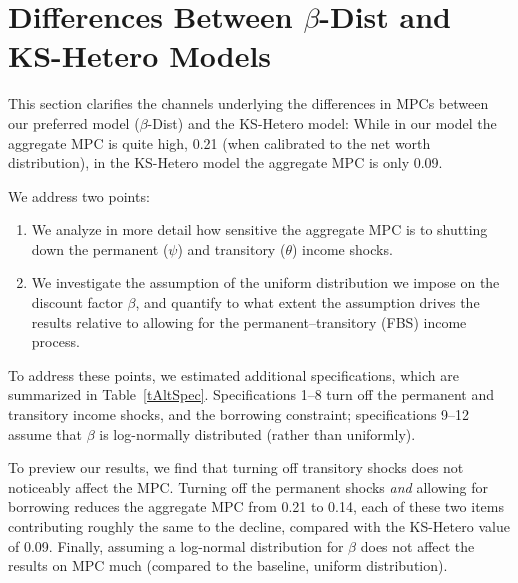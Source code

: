 \documentclass{econtex}\usepackage[pdftex]{graphicx}\usepackage{epstopdf} \usepackage[pdftex]{hyperref}
\begin{document}
\section{Differences Between $\beta$-Dist and KS-Hetero Models}\label{sec:betaDist}


This section clarifies the channels underlying the differences in MPCs between our preferred model ($\beta$-Dist) and the KS-Hetero model: While in our model the aggregate MPC is quite high, 0.21 (when calibrated to the net worth distribution), in the KS-Hetero model the aggregate MPC is only 0.09.

We address two points:
\begin{enumerate}
\item We analyze in more detail how sensitive the aggregate MPC is to shutting down the permanent ($\psi$) and transitory ($\theta$) income shocks.
\item We investigate the assumption of the uniform distribution we impose on the discount factor $\beta$, and quantify to what extent the assumption drives the results relative to allowing for the permanent--transitory (FBS) income process.
\end{enumerate}

To address these points, we estimated additional specifications, which are summarized in Table~\ref{tAltSpec}. Specifications 1--8 turn off the permanent and transitory income shocks, and the borrowing constraint; specifications  9--12 assume that $\beta$ is log-normally distributed (rather than uniformly).

To preview our results, we find that turning off transitory shocks does not noticeably affect the MPC. Turning off the permanent shocks \emph{and} allowing for borrowing reduces the aggregate MPC from 0.21 to 0.14, each of these two items contributing roughly the same to the decline, compared with the KS-Hetero value of 0.09.  Finally, assuming a log-normal distribution for $\beta$ does not affect the results on MPC much (compared to the baseline, uniform distribution).
\end{document}

